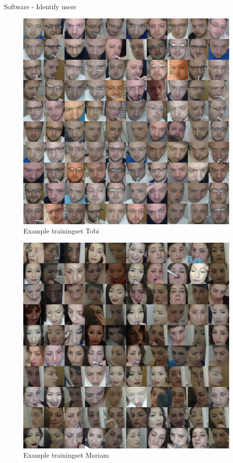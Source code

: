 \documentclass[xcolor=svgnames,handout,aspectratio=169]{beamer}
\begin{document}
\begin{frame}
	{Software - Identify users}
	\parbox{0.45\linewidth}{
	\begin{figure}
	\includegraphics[width=\linewidth]{images/mosaic_tobi.png}
	\caption{Example trainingset Tobi}
	\end{figure}
	}
	\parbox{0.45\linewidth}{	
	\begin{figure}
	\includegraphics[width=\linewidth]{images/mosaic_mari.png}
	\caption{Example trainingset Mariam}	
	\end{figure}
	}
\end{frame}
\end{document}

